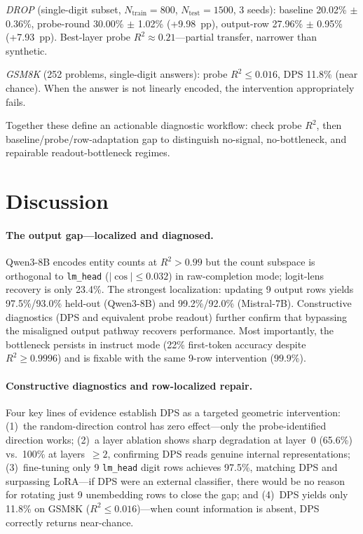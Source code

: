 \documentclass{article}
\begin{document}
\emph{DROP} (single-digit subset, $N_{\text{train}}{=}800$, $N_{\text{test}}{=}1500$, 3 seeds):
baseline 20.02\% $\pm$ 0.36\%, probe-round 30.00\% $\pm$ 1.02\% (+9.98~pp), output-row 27.96\% $\pm$ 0.95\% (+7.93~pp).
Best-layer probe $R^2 \approx 0.21$---partial transfer, narrower than synthetic.

\emph{GSM8K} (252 problems, single-digit answers):
probe $R^2 \leq 0.016$, DPS 11.8\% (near chance).
When the answer is not linearly encoded, the intervention appropriately fails.

Together these define an actionable diagnostic workflow: check probe $R^2$, then baseline/probe/row-adaptation gap to distinguish no-signal, no-bottleneck, and repairable readout-bottleneck regimes.

\section{Discussion}
\label{sec:discussion}

\paragraph{The output gap---localized and diagnosed.}
Qwen3-8B encodes entity counts at $R^2>0.99$ but the count subspace is orthogonal to \texttt{lm\_head} ($|\cos| \leq 0.032$) in raw-completion mode; logit-lens recovery is only 23.4\%.
The strongest localization: updating 9 output rows yields 97.5\%/93.0\% held-out (Qwen3-8B) and 99.2\%/92.0\% (Mistral-7B).
Constructive diagnostics (DPS and equivalent probe readout) further confirm that bypassing the misaligned output pathway recovers performance.
Most importantly, the bottleneck persists in instruct mode (22\% first-token accuracy despite $R^2 \geq 0.9996$) and is fixable with the same 9-row intervention ($99.9\%$).

\paragraph{Constructive diagnostics and row-localized repair.}
Four key lines of evidence establish DPS as a targeted geometric intervention:
(1)~the random-direction control has zero effect---only the probe-identified direction works;
(2)~a layer ablation shows sharp degradation at layer~0 (65.6\%) vs.\ 100\% at layers~$\geq 2$,
confirming DPS reads genuine internal representations;
(3)~fine-tuning only 9 \texttt{lm\_head} digit rows achieves 97.5\%,
matching DPS and surpassing LoRA---if DPS were an external classifier, there would be no
reason for rotating just 9 unembedding rows to close the gap;
and (4)~DPS yields only 11.8\% on GSM8K ($R^2 \le 0.016$)---when count information is
absent, DPS correctly returns near-chance.
\end{document}
